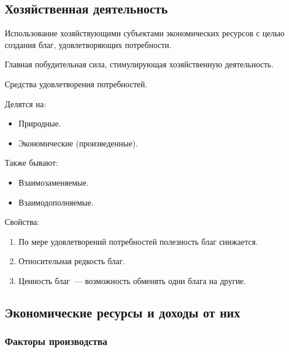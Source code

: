 \documentclass[12pt]{article}
\begin{document}
	\subsection{Хозяйственная деятельность}
	
	\begin{definition}
		Использование хозяйствующими субъектами экономических ресурсов с целью создания благ, удовлетворяющих потребности.
	\end{definition}
	
	\begin{definition}[Потребности]
		Главная побудительная сила, стимулирующая хозяйственную деятельность.
	\end{definition}
	
	\begin{definition}[Блага]
		Средства удовлетворения потребностей.
		
		Делятся на:
		
		\begin{itemize}
			\item Природные.
			\item Экономические (произведенные).
		\end{itemize}
		
		Также бывают:
		
		\begin{itemize}
			\item Взаимозаменяемые.
			\item Взаимодополняемые.
		\end{itemize}
		
		Свойства:
		
		\begin{enumerate}
			\item По мере удовлетворений потребностей полезность благ снижается.
			\item Относительная редкость благ.
			\item Ценность благ~--- возможность обменять одни блага на другие.
		\end{enumerate}
	\end{definition}
	
	\subsection{Экономические ресурсы и доходы от них}
	
	\subsubsection{Факторы производства}
	
\end{document}
